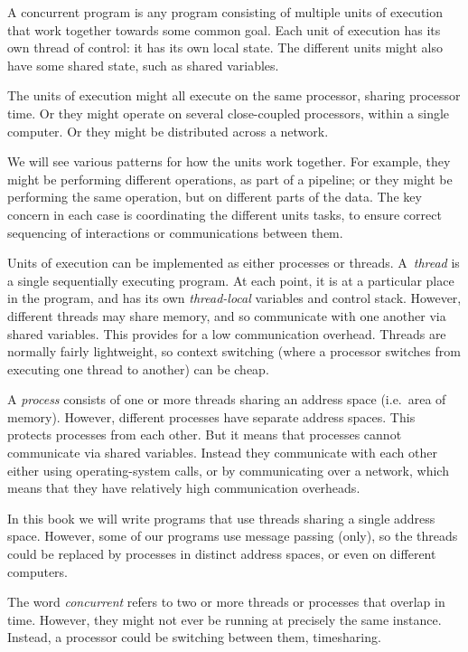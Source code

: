 A concurrent program is any program consisting of multiple units of execution
that work together towards some common goal.  Each unit of execution has its
own thread of control: it has its own local state.  The different units might
also have some shared state, such as shared variables.  

The units of execution might all execute on the same processor, sharing
processor time.  Or they might operate on several close-coupled processors,
within a single computer.  Or they might be distributed across a network.

We will see various patterns for how the units work together.  For example,
they might be performing different operations, as part of a pipeline; or they
might be performing the same operation, but on different parts of the data.
%
The key concern in each case is coordinating the different units tasks, to ensure
correct sequencing of interactions or communications between them.


Units of execution can be implemented as either processes or threads.
%
A~\emph{thread} is a single sequentially executing program.  At each point, it
is at a particular place in the program, and has its own \emph{thread-local}
variables and control stack.  However, different threads may share memory, and
so communicate with one another via shared variables.  This provides for a low
communication overhead.  Threads are normally fairly lightweight, so context
switching (where a processor switches from executing one thread to another)
can be cheap.

A \emph{process} consists of one or more threads sharing an address space
(i.e.~area of memory).  However, different processes have separate address
spaces.  This protects processes from each other.  But it means that processes
cannot communicate via shared variables.  Instead they communicate with each
other either using operating-system calls, or by communicating over a network,
which means that they have relatively high communication overheads.

In this book we will write programs that use threads sharing a single address
space.  However, some of our programs use message passing (only), so the
threads could be replaced by processes in distinct address spaces, or even on
different computers.

The word \emph{concurrent} refers to two or more threads or processes that
overlap in time.  However, they might not ever be running at precisely the
same instance.  Instead, a processor could be switching between them,
timesharing.

